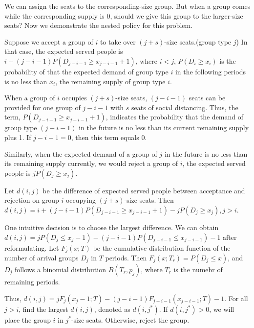 We can assign the seats to the corresponding-size group. But when a group comes while the corresponding supply is 0, should we give this group to the larger-size seats? Now we demonstrate the nested policy for this problem.

Suppose we accept a group of $i$ to take over $(j+s)$-size seats.(group type $j$) In that case, the expected served people is $i + (j-i-1)P(D_{j-i-1} \geq x_{j-i-1}+1)$, where $i < j$, $P(D_i \geq x_i)$ is the probability of that the expected demand of group type $i$ in the following periods is no less than $x_i$, the remaining supply of group type $i$.

When a group of $i$ occupies $(j+s)$-size seats, $(j-i-1)$ seats can be provided for one group of $j-i-1$ with $s$ seats of social distancing.
Thus, the term, $P(D_{j-i-1} \geq x_{j-i-1}+1)$, indicates the probability that the demand of group type $(j-i-1)$ in the future is no less than its current remaining supply plus 1. If $j -i- 1 =0$, then this term equals 0.

Similarly, when the expected demand of a group of $j$ in the future is no less than its remaining supply currently, we would reject a group of $i$, the expected served people is $j P(D_{j} \geq x_{j})$.

Let $d(i,j)$ be the difference of expected served people between acceptance and rejection on group $i$ occupying $(j+s)$-size seats. Then $d(i,j) = i + (j-i-1)P(D_{j-i-1} \geq x_{j-i-1}+1) - j P(D_{j} \geq x_{j}), j >i$.

One intuitive decision is to choose the largest difference.
We can obtain $d(i,j) = j P(D_{j} \leq x_{j} -1) - (j-i-1)P(D_{j-i-1} \leq x_{j-i-1}) -1$ after reformulating. Let $F_{j}(x;T)$ be the cumulative distribution function of the number of arrival groups $D_{j}$ in $T$ periods. Then $F_{j}(x; T_{r}) = P(D_{j} \leq x)$, and $D_{j}$ follows a binomial distribution $B(T_{r}, p_{j})$, where $T_{r}$ is the numebr of remaining periods.

Thus, $d(i,j) = j F_{j}(x_{j}-1; T) - (j-i-1) F_{j-i-1}(x_{j-i-1}; T) -1$. For all $j >i$, find the largest $d(i,j)$, denoted as $d(i,j^{*})$. If $d(i,j^{*}) >0$, we will place the group $i$ in $j^{*}$-size seats. Otherwise, reject the group.


